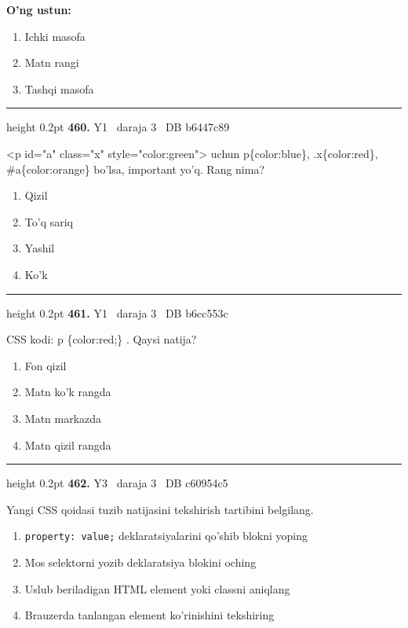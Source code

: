 \documentclass[10pt,a4paper,oneside]{article}
\begin{document}
\textbf{\footnotesize O'ng ustun:}
\begin{enumerate}[label=\Alph*),leftmargin=9mm]
\item Ichki masofa
\item Matn rangi
\item Tashqi masofa
\end{enumerate}
\vspace{2mm}\hrule height 0.2pt \vspace{4mm}
\hypertarget{q460}{\textbf{\color{ink}460.}}  {\color{muted}\scriptsize Y1 \textbullet\ daraja 3 \textbullet\ DB b6447c89}
\par
\textless{}p id="a" class="x" style="color:green"\textgreater{} uchun p\{color:blue\}, .x\{color:red\}, \#a\{color:orange\} bo'lsa, important yo'q. Rang nima?
\begin{enumerate}[label=\Alph*),leftmargin=9mm]
\item Qizil
\item To'q sariq
\item Yashil
\item Ko'k
\end{enumerate}
\vspace{2mm}\hrule height 0.2pt \vspace{4mm}
\hypertarget{q461}{\textbf{\color{ink}461.}}  {\color{muted}\scriptsize Y1 \textbullet\ daraja 3 \textbullet\ DB b6cc553c}
\par
CSS kodi: p \{color:red;\} . Qaysi natija?
\begin{enumerate}[label=\Alph*),leftmargin=9mm]
\item Fon qizil
\item Matn ko'k rangda
\item Matn markazda
\item Matn qizil rangda
\end{enumerate}
\vspace{2mm}\hrule height 0.2pt \vspace{4mm}
\hypertarget{q462}{\textbf{\color{ink}462.}}  {\color{muted}\scriptsize Y3 \textbullet\ daraja 3 \textbullet\ DB c60954c5}
\par
Yangi CSS qoidasi tuzib natijasini tekshirish tartibini belgilang.
\begin{enumerate}[label=\Alph*),leftmargin=9mm]
\item \texttt{property: value;} deklaratsiyalarini qo'shib blokni yoping
\item Mos selektorni yozib deklaratsiya blokini oching
\item Uslub beriladigan HTML element yoki classni aniqlang
\item Brauzerda tanlangan element ko'rinishini tekshiring
\end{enumerate}
\end{document}
